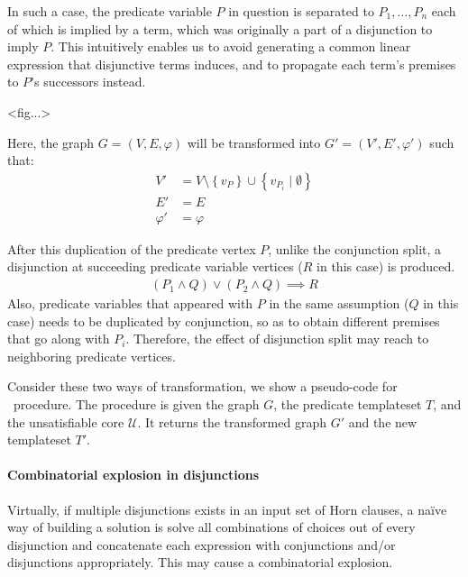 In such a case, the predicate variable $P$ in question is separated to
$P_1, \ldots, P_n$ each of which is implied by a term, which was
originally a part of a disjunction to imply $P$.  This intuitively
enables us to avoid generating a common linear expression that
disjunctive terms induces, and to propagate each term's premises to
$P$'s successors instead.

<fig...>

Here, the graph $G=(V,E,\varphi)$ will be transformed into
$G'=(V',E',\varphi')$ such that:
\begin{align*}
V' & = V \setminus \left\lbrace v_P \right\rbrace \cup
  \left\lbrace v_{P_i} \mid \emptyset \right\rbrace \\
E' & = E \\
\varphi' & = \varphi
\end{align*}

After this duplication of the predicate vertex $P$, unlike the
conjunction split, a disjunction at succeeding predicate
variable vertices ($R$ in this case) is produced.
\begin{align*}
(P_1 \wedge Q) \vee (P_2 \wedge Q) \implies R
\end{align*}
Also, predicate variables that appeared with $P$ in the same
assumption ($Q$ in this case) needs to be duplicated by conjunction,
so as to obtain different premises that go along with $P_i$.
Therefore, the effect of disjunction split may reach to neighboring
predicate vertices.


Consider these two ways of transformation, we show a pseudo-code for
\linebreak \transGraph~procedure.  The procedure is given the graph
$G$, the predicate templateset $T$, and the unsatisfiable core
$\mathcal{U}$. It returns the transformed graph $G'$ and the new
templateset $T'$.

\begin{algorithm}
\caption{$ \transGraph (G, T, \mathcal{U}) $}\label{alg:transGraph}
\begin{algorithmic}
\end{algorithmic}
\end{algorithm}


\paragraph{Combinatorial explosion in disjunctions}
Virtually, if multiple disjunctions exists in an input set of Horn
clauses, a na\"{i}ve way of building a solution is solve all
combinations of choices out of every disjunction and concatenate each
expression with conjunctions and/or disjunctions appropriately.  This
may cause a combinatorial explosion.

